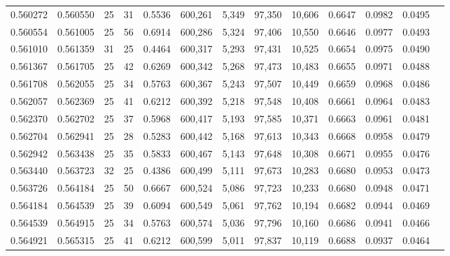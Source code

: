 \begin{tabular}{rrrrrrrrrrrrr}
0.560272 & 0.560550 &    25 &  31 &                                     0.5536 & 600,261 &   5,349 &  97,350 &  10,606 & 0.6647 & 0.0982 & 0.0495 \\
0.560554 & 0.561005 &    25 &  56 &                                     0.6914 & 600,286 &   5,324 &  97,406 &  10,550 & 0.6646 & 0.0977 & 0.0493 \\
0.561010 & 0.561359 &    31 &  25 &                                     0.4464 & 600,317 &   5,293 &  97,431 &  10,525 & 0.6654 & 0.0975 & 0.0490 \\
0.561367 & 0.561705 &    25 &  42 &                                     0.6269 & 600,342 &   5,268 &  97,473 &  10,483 & 0.6655 & 0.0971 & 0.0488 \\
0.561708 & 0.562055 &    25 &  34 &                                     0.5763 & 600,367 &   5,243 &  97,507 &  10,449 & 0.6659 & 0.0968 & 0.0486 \\
0.562057 & 0.562369 &    25 &  41 &                                     0.6212 & 600,392 &   5,218 &  97,548 &  10,408 & 0.6661 & 0.0964 & 0.0483 \\
0.562370 & 0.562702 &    25 &  37 &                                     0.5968 & 600,417 &   5,193 &  97,585 &  10,371 & 0.6663 & 0.0961 & 0.0481 \\
0.562704 & 0.562941 &    25 &  28 &                                     0.5283 & 600,442 &   5,168 &  97,613 &  10,343 & 0.6668 & 0.0958 & 0.0479 \\
0.562942 & 0.563438 &    25 &  35 &                                     0.5833 & 600,467 &   5,143 &  97,648 &  10,308 & 0.6671 & 0.0955 & 0.0476 \\
0.563440 & 0.563723 &    32 &  25 &                                     0.4386 & 600,499 &   5,111 &  97,673 &  10,283 & 0.6680 & 0.0953 & 0.0473 \\
0.563726 & 0.564184 &    25 &  50 &                                     0.6667 & 600,524 &   5,086 &  97,723 &  10,233 & 0.6680 & 0.0948 & 0.0471 \\
0.564184 & 0.564539 &    25 &  39 &                                     0.6094 & 600,549 &   5,061 &  97,762 &  10,194 & 0.6682 & 0.0944 & 0.0469 \\
0.564539 & 0.564915 &    25 &  34 &                                     0.5763 & 600,574 &   5,036 &  97,796 &  10,160 & 0.6686 & 0.0941 & 0.0466 \\
0.564921 & 0.565315 &    25 &  41 &                                     0.6212 & 600,599 &   5,011 &  97,837 &  10,119 & 0.6688 & 0.0937 & 0.0464 \\

\end{tabular}
